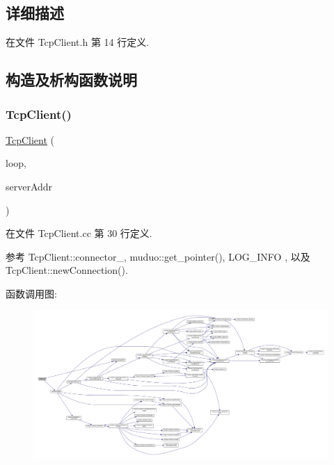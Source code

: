 \subsection{详细描述}


在文件 Tcp\+Client.\+h 第 14 行定义.



\subsection{构造及析构函数说明}
\mbox{\label{classmuduo_1_1TcpClient_a8d68694b0595253edef974e8ee289d4c}} 
\subsubsection{\texorpdfstring{Tcp\+Client()}{TcpClient()}}
{\footnotesize\ttfamily \hyperlink{classmuduo_1_1TcpClient}{Tcp\+Client} (\begin{DoxyParamCaption}\item[{\hyperlink{classmuduo_1_1EventLoop}{Event\+Loop} $\ast$}]{loop,  }\item[{const \hyperlink{classmuduo_1_1InetAddress}{Inet\+Address} \&}]{server\+Addr }\end{DoxyParamCaption})}



在文件 Tcp\+Client.\+cc 第 30 行定义.



参考 Tcp\+Client\+::connector\+\_\+, muduo\+::get\+\_\+pointer(), L\+O\+G\+\_\+\+I\+N\+FO , 以及 Tcp\+Client\+::new\+Connection().

函数调用图\+:
\nopagebreak
\begin{figure}[H]
\begin{center}
\leavevmode
\includegraphics[width=350pt]{classmuduo_1_1TcpClient_a8d68694b0595253edef974e8ee289d4c_cgraph}
\end{center}
\end{figure}
\mbox{\label{classmuduo_1_1TcpClient_a01845d2886f327b9c8cb5df03cb00d7c}} 
